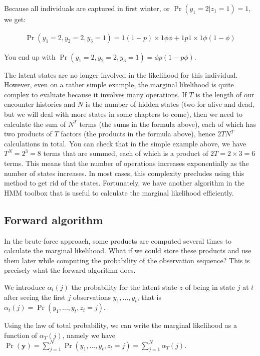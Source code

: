\documentclass[
  12pt,
]{krantz}
\begin{document}
Because all individuals are captured in first winter, or \(\Pr(y_1 = 2 | z_1 = 1) = 1\), we get:

\begin{align*}
\Pr(y_1 = 2, y_2 = 2, y_3 = 1) =  1 (1-p) \times 1 \phi \phi + 1 p 1 \times 1 \phi (1-\phi)
\end{align*}

You end up with \(\Pr(y_1 = 2, y_2 = 2, y_3 = 1) = \phi p (1 - p\phi)\).

The latent states are no longer involved in the likelihood for this individual. However, even on a rather simple example, the marginal likelihood is quite complex to evaluate because it involves many operations. If \(T\) is the length of our encounter histories and \(N\) is the number of hidden states (two for alive and dead, but we will deal with more states in some chapters to come), then we need to calculate the sum of \(N^T\) terms (the sums in the formula above), each of which has two products of \(T\) factors (the products in the formula above), hence \(2TN^T\) calculations in total. You can check that in the simple example above, we have \(T^N = 2^3 = 8\) terms that are summed, each of which is a product of \(2T = 2 \times 3 = 6\) terms. This means that the number of operations increases exponentially as the number of states increases. In most cases, this complexity precludes using this method to get rid of the states. Fortunately, we have another algorithm in the HMM toolbox that is useful to calculate the marginal likelihood efficiently.

\subsection{Forward algorithm}\label{forward-algorithm}

In the brute-force approach, some products are computed several times to calculate the marginal likelihood. What if we could store these products and use them later while computing the probability of the observation sequence? This is precisely what the forward algorithm does.

We introduce \(\alpha_t(j)\) the probability for the latent state \(z\) of being in state \(j\) at \(t\) after seeing the first \(j\) observations \(y_1, \ldots, y_t\), that is \(\alpha_t(j) = \Pr(y_1, \ldots, y_t, z_t = j)\).

Using the law of total probability, we can write the marginal likelihood as a function of \(\alpha_T(j)\), namely we have \(\Pr(\mathbf{y}) = \displaystyle{\sum_{j=1}^N\Pr(y_1, \ldots, y_t, z_t = j)} = \displaystyle{\sum_{j=1}^N\alpha_T(j)}\).
\end{document}
